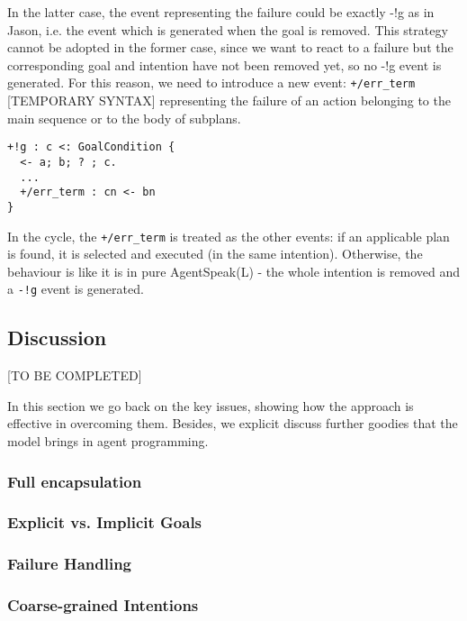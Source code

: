 \noindent In the latter case, the event representing the failure could be exactly -!g as in Jason, i.e. the event which is generated when the goal is removed.
%
This strategy cannot be adopted in the former case, since we want to react to a failure but the corresponding goal and intention have not been removed yet, so no -!g event is generated. For this reason, we need to introduce a new event:  \texttt{+/err\_term}  [TEMPORARY SYNTAX]  representing the failure of an action belonging to the main sequence or to the body of subplans.  

{\small
\begin{verbatim}
+!g : c <: GoalCondition {
  <- a; b; ? ; c. 
  ...
  +/err_term : cn <- bn
}
\end{verbatim}}

\noindent In the cycle, the \texttt{+/err\_term} is treated as the other events: if an applicable plan is found, it is selected and executed (in the same intention). 
%
Otherwise, the behaviour is like it is in pure AgentSpeak(L) - the whole intention is removed and a \texttt{-!g} event is generated.

\subsection{Discussion}

[TO BE COMPLETED]

In this section we go back on the key issues, showing how the approach is effective in overcoming them.
%
Besides, we explicit discuss further goodies that the model brings in agent programming.

\subsubsection{Full encapsulation}

\subsubsection{Explicit vs. Implicit Goals}

\subsubsection{Failure Handling}

\subsubsection{Coarse-grained Intentions}

